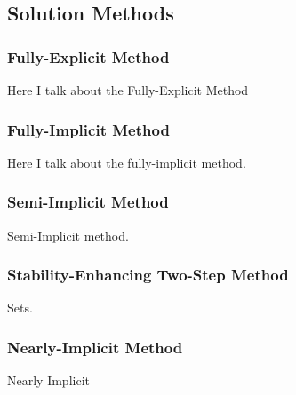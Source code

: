\documentclass[compress]{beamer}
\begin{document}
\subsection[Solution Methods]{Solution Methods}
\begin{frame}
\frametitle{Fully-Explicit Method}

Here I talk about the Fully-Explicit Method

\end{frame}
\begin{frame}
\frametitle{Fully-Implicit Method}

Here I talk about the fully-implicit method.

\end{frame}
\begin{frame}
\frametitle{Semi-Implicit Method}

Semi-Implicit method.

\end{frame}
\begin{frame}
\frametitle{Stability-Enhancing Two-Step Method}

Sets.

\end{frame}
\begin{frame}
\frametitle{Nearly-Implicit Method}

Nearly Implicit

\end{frame}
\end{document}
